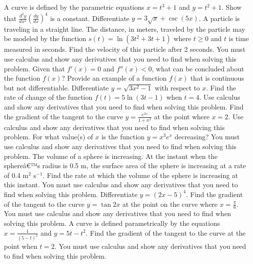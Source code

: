 \documentclass[12pt,addpoints]{exam}
\begin{document}
\begin{questions}
\fillwithlines{5cm}
\question[5] A curve is defined by the parametric equations \( x = t^3 + 1 \) and \( y = t^2 + 1 \). Show that \(\frac{d^2y}{dx^2} \left( \frac{dy}{dx} \right)^4\) is a constant.
\fillwithlines{5cm}
\question[5] Differentiate \( y = 3\sqrt{x} + \csc(5x) \).
\fillwithlines{5cm}
\question[5] A particle is traveling in a straight line. The distance, in meters, traveled by the particle may be modeled by the function \( s(t) = \ln(3t^2 + 3t + 1) \) where \( t \geq 0 \) and \( t \) is time measured in seconds. Find the velocity of this particle after 2 seconds. You must use calculus and show any derivatives that you need to find when solving this problem.
\fillwithlines{5cm}
\question[5] Given that \( f'(x) = 0 \) and \( f''(x) < 0 \), what can be concluded about the function \( f(x) \)?
\fillwithlines{5cm}
\question[5] Provide an example of a function \( f(x) \) that is continuous but not differentiable.
\fillwithlines{5cm}
\question[5] Differentiate \( y = \sqrt{3x^2 - 1} \) with respect to \( x \).
\fillwithlines{5cm}
\question[5] Find the rate of change of the function \( f(t) = 5 \ln(3t - 1) \) when \( t = 4 \). Use calculus and show any derivatives that you need to find when solving this problem.
\fillwithlines{5cm}
\question[5] Find the gradient of the tangent to the curve \( y = \frac{e^{2x}}{1 + x^2} \) at the point where \( x = 2 \). Use calculus and show any derivatives that you need to find when solving this problem.
\fillwithlines{5cm}
\question[5] For what value(s) of \( x \) is the function \( y = x^3 e^x \) decreasing? You must use calculus and show any derivatives that you need to find when solving this problem.
\fillwithlines{5cm}
\question[5] The volume of a sphere is increasing. At the instant when the sphereâ€™s radius is 0.5 m, the surface area of the sphere is increasing at a rate of 0.4 m\(^2\) s\(^{-1}\). Find the rate at which the volume of the sphere is increasing at this instant. You must use calculus and show any derivatives that you need to find when solving this problem.
\fillwithlines{5cm}
\question[5] Differentiate \( y = (2x - 5)^4 \).
\fillwithlines{5cm}
\question[5] Find the gradient of the tangent to the curve \( y = \tan 2x \) at the point on the curve where \( x = \frac{\pi}{6} \). You must use calculus and show any derivatives that you need to find when solving this problem.
\fillwithlines{5cm}
\question[5] A curve is defined parametrically by the equations \( x = \frac{1}{(5-t)^2} \) and \( y = 5t - t^2 \). Find the gradient of the tangent to the curve at the point when \( t = 2 \). You must use calculus and show any derivatives that you need to find when solving this problem.

\end{questions}
\end{document}
